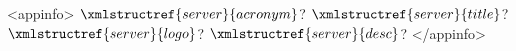 <appinfo>
  $\xmlstructref{server}{acronym}$?
  $\xmlstructref{server}{title}$?
  $\xmlstructref{server}{logo}$?
  $\xmlstructref{server}{desc}$?
</appinfo>
